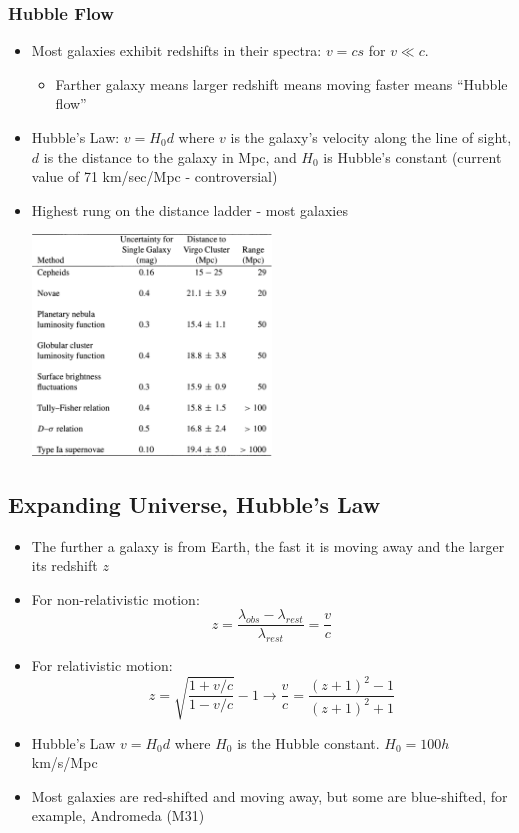 \documentclass{book}
\begin{document}
\subsubsection{Hubble Flow}
\begin{itemize}
    \item Most galaxies exhibit redshifts in their spectra: $v = cs$ for $v \ll c$.
          \begin{itemize}
              \item Farther galaxy means larger redshift means moving faster means ``Hubble flow''
          \end{itemize}
    \item Hubble's Law: $v = H_0 d$ where $v$ is the galaxy's velocity along the line of sight, $d$ is the distance to the galaxy in Mpc, and $H_0$ is Hubble's constant (current value of 71 km/sec/Mpc - controversial)
    \item Highest rung on the distance ladder - most galaxies
          \begin{center}
              \includegraphics[width=0.5\textwidth]{images/dist_ladd.png}
          \end{center}
\end{itemize}
\subsection{Expanding Universe, Hubble's Law}
\begin{itemize}
    \item The further a galaxy is from Earth, the fast it is moving away and the larger its redshift $z$
    \item For non-relativistic motion: $$z = \frac{\lambda_{obs} - \lambda_{rest}}{\lambda_{rest}} = \frac{v}{c}$$
    \item For relativistic motion: $$z = \sqrt{\frac{1 + v/c}{1 - v/c}} - 1 \to \frac{v}{c} = \frac{(z+1)^2 - 1}{(z+1)^2 + 1}$$
    \item Hubble's Law $v = H_0 d$ where $H_0$ is the Hubble constant. $H_0 = 100 h$ km/s/Mpc
    \item Most galaxies are red-shifted and moving away, but some are blue-shifted, for example, Andromeda (M31)
\end{itemize}
\end{document}
